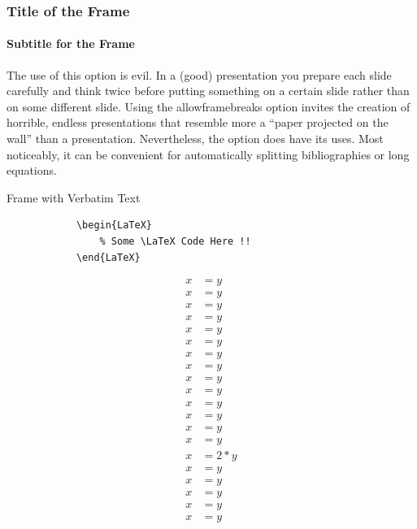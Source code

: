 \documentclass{beamer}
\begin{document}
	\begin{frame}[allowframebreaks, t]
		\frametitle{Title of the Frame}
		\framesubtitle{Subtitle for the Frame}
		\kant[1]
		The use of this option is evil. In a (good) presentation you prepare each slide carefully and think
twice before putting something on a certain slide rather than on some different slide. Using the
allowframebreaks option invites the creation of horrible, endless presentations that resemble more
a “paper projected on the wall” than a presentation. Nevertheless, the option does have its uses.
Most noticeably, it can be convenient for automatically splitting bibliographies or long equations.
	\end{frame}
	
	\begin{frame}[fragile, t]{Frame with Verbatim Text}
		\begin{verbatim}
			\begin{LaTeX}
				% Some \LaTeX Code Here !!
			\end{LaTeX}
		\end{verbatim}
	\end{frame}
	
	\begin{frame}
		\begin{align*}
			x&=y \\ x&=y \\ x&=y \\ x&=y \\ x&=y \\ 
			x&=y \\ x&=y \\ x&=y \\ x&=y \\ x&=y \\ 
			x&=y \\ x&=y \\ x&=y \\ x&=y \\ 
			x&=2*y \\ 
			x&=y \\ x&=y \\ x&=y \\ x&=y \\ x&=y 
		\end{align*}
	\end{frame}
	
\end{document}
